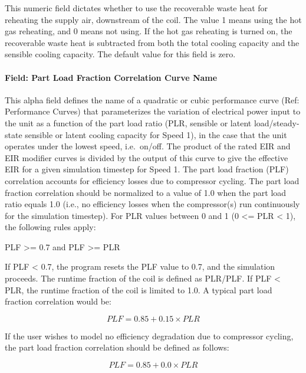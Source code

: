 This numeric field dictates whether to use the recoverable waste heat for reheating the supply air, downstream of the coil. The value 1 means using the hot gas reheating, and 0 means not using. If the hot gas reheating is turned on, the recoverable waste heat is subtracted from both the total cooling capacity and the sensible cooling capacity. The default value for this field is zero.

\paragraph{Field: Part Load Fraction Correlation Curve Name}\label{field-part-load-fraction-correlation-curve-name-10}

This alpha field defines the name of a quadratic or cubic performance curve (Ref: Performance Curves) that parameterizes the variation of electrical power input to the unit as a function of the part load ratio (PLR, sensible or latent load/steady-state sensible or latent cooling capacity for Speed 1), in the case that the unit operates under the lowest speed, i.e.~on/off. The product of the rated EIR and EIR modifier curves is divided by the output of this curve to give the effective EIR for a given simulation timestep for Speed 1. The part load fraction (PLF) correlation accounts for efficiency losses due to compressor cycling. The part load fraction correlation should be normalized to a value of 1.0 when the part load ratio equals 1.0 (i.e., no efficiency losses when the compressor(s) run continuously for the simulation timestep). For PLR values between 0 and 1 (0 \textless{}= PLR \textless{} 1), the following rules apply:

PLF \textgreater{}= 0.7 and PLF \textgreater{}= PLR

If PLF \textless{} 0.7, the program resets the PLF value to 0.7, and the simulation proceeds. The runtime fraction of the coil is defined as PLR/PLF. If PLF \textless{} PLR, the runtime fraction of the coil is limited to 1.0. A typical part load fraction correlation would be:

\begin{equation}
PLF = 0.85 + 0.15 \times PLR
\end{equation}

If the user wishes to model no efficiency degradation due to compressor cycling, the part load fraction correlation should be defined as follows:

\begin{equation}
PLF = 0.85 + 0.0 \times PLR
\end{equation}

